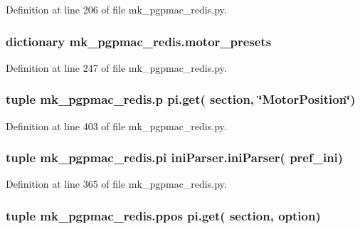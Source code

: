 Definition at line 206 of file mk\-\_\-pgpmac\-\_\-redis.\-py.

\hypertarget{namespacemk__pgpmac__redis_a2a04d8d0b7270384d1fac674c29e774a}{
\subsubsection[{motor\-\_\-presets}]{\setlength{\rightskip}{0pt plus 5cm}dictionary mk\-\_\-pgpmac\-\_\-redis.\-motor\-\_\-presets}}\label{namespacemk__pgpmac__redis_a2a04d8d0b7270384d1fac674c29e774a}


Definition at line 247 of file mk\-\_\-pgpmac\-\_\-redis.\-py.

\hypertarget{namespacemk__pgpmac__redis_a11daf2847f2dc94562b5b61b3f412574}{
\subsubsection[{p}]{\setlength{\rightskip}{0pt plus 5cm}tuple mk\-\_\-pgpmac\-\_\-redis.\-p pi.\-get( section, \char`\"{}Motor\-Position\char`\"{})}}\label{namespacemk__pgpmac__redis_a11daf2847f2dc94562b5b61b3f412574}


Definition at line 403 of file mk\-\_\-pgpmac\-\_\-redis.\-py.

\hypertarget{namespacemk__pgpmac__redis_a2f5bbda0250eecd94d166dc0a2fbff86}{
\subsubsection[{pi}]{\setlength{\rightskip}{0pt plus 5cm}tuple mk\-\_\-pgpmac\-\_\-redis.\-pi {\bf ini\-Parser.\-ini\-Parser}( {\bf pref\-\_\-ini})}}\label{namespacemk__pgpmac__redis_a2f5bbda0250eecd94d166dc0a2fbff86}


Definition at line 365 of file mk\-\_\-pgpmac\-\_\-redis.\-py.

\hypertarget{namespacemk__pgpmac__redis_aadd7321b8f7efe139c3e92e51cd34c00}{
\subsubsection[{ppos}]{\setlength{\rightskip}{0pt plus 5cm}tuple mk\-\_\-pgpmac\-\_\-redis.\-ppos pi.\-get( section, option)}}\label{namespacemk__pgpmac__redis_aadd7321b8f7efe139c3e92e51cd34c00}


